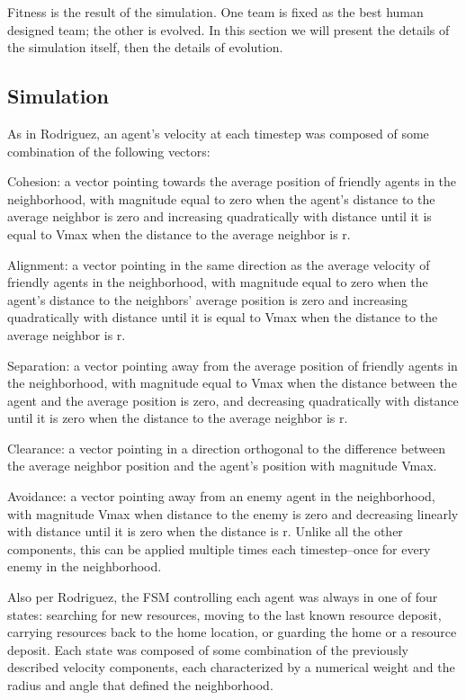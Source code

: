 \documentclass[12pt,journal,compsoc]{IEEEtran}
\begin{document}
Fitness is the result of the simulation. One team is fixed as the best human designed team; the other is evolved. In this section we will present the details of the simulation itself, then the details of evolution.

\subsection{Simulation}

As in Rodriguez, an agent's velocity at each timestep was composed of some combination of the following vectors:

Cohesion: a vector pointing towards the average position of friendly agents in the neighborhood, with magnitude equal to zero when the agent's distance to the average neighbor is zero and increasing quadratically with distance until it is equal to Vmax when the distance to the average neighbor is r.

Alignment: a vector pointing in the same direction as the average velocity of friendly agents in the neighborhood, with magnitude equal to zero when the agent's distance to the neighbors' average position is zero and increasing quadratically with distance until it is equal to Vmax when the distance to the average neighbor is r.

Separation: a vector pointing away from the average position of friendly agents in the neighborhood, with magnitude equal to Vmax when the distance between the agent and the average position is zero, and decreasing quadratically with distance until it is zero when the distance to the average neighbor is r.


Clearance: a vector pointing in a direction orthogonal to the difference between the average neighbor position and the agent's position with magnitude Vmax.

Avoidance: a vector pointing away from an enemy agent in the neighborhood, with magnitude Vmax when distance to the enemy is zero and decreasing linearly with distance until it is zero when the distance is r. Unlike all the other components, this can be applied multiple times each timestep--once for every enemy in the neighborhood.

Also per Rodriguez, the FSM controlling each agent was always in one of four states: searching for new resources, moving to the last known resource deposit, carrying resources back to the home location, or guarding the home or a resource deposit. Each state was composed of some combination of the previously described velocity components, each characterized by a numerical weight and the radius and angle that defined the neighborhood.
\end{document}
